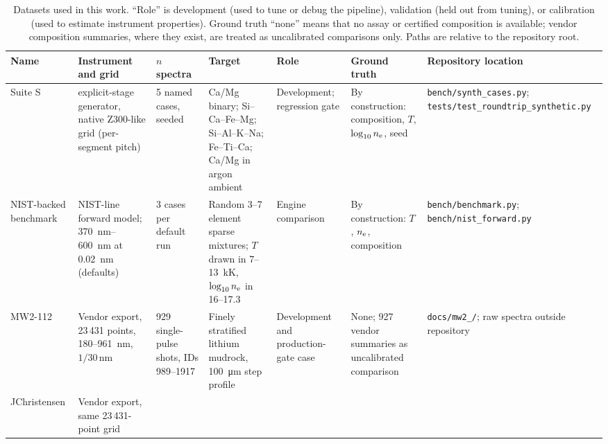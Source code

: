 \begin{table}[t]
\centering
\footnotesize
\setlength{\tabcolsep}{3pt}
\caption{Datasets used in this work. ``Role'' is development (used to tune or debug the pipeline), validation (held out from tuning), or calibration (used to estimate instrument properties). Ground truth ``none'' means that no assay or certified composition is available; vendor composition summaries, where they exist, are treated as uncalibrated comparisons only. Paths are relative to the repository root.}
\label{tab:datasets}
\begin{tabular}{@{}p{1.05cm}p{2.7cm}p{1.3cm}p{2.3cm}p{1.7cm}p{2.6cm}p{3.2cm}@{}}
\toprule
Name & Instrument and grid & $n$ spectra & Target & Role & Ground truth & Repository location \\
\midrule
Suite S & \alibz{} explicit-stage generator, native Z300-like grid (per-segment pitch) & 5 named cases, seeded & Ca/Mg binary; Si--Ca--Fe--Mg; Si--Al--K--Na; Fe--Ti--Ca; Ca/Mg in argon ambient & Development; regression gate & By construction: composition, $T$, $\log_{10}n_{\mathrm{e}}$, seed %
 & \texttt{bench/\allowbreak synth\_\allowbreak cases.py}; \texttt{tests/\allowbreak test\_\allowbreak roundtrip\_\allowbreak synthetic.py} \\
NIST-backed benchmark & NIST-line forward model; \SIrange{370}{600}{\nano\metre} at \SI{0.02}{\nano\metre} (defaults) & 3 cases per default run & Random 3--7 element sparse mixtures; $T$ drawn in 7--\SI{13}{\kilo\kelvin}, $\log_{10}n_{\mathrm{e}}$ in 16--17.3 %
 & Engine comparison & By construction: $T$, $n_{\mathrm{e}}$, composition & \texttt{bench/\allowbreak benchmark.py}; \texttt{bench/\allowbreak nist\_\allowbreak forward.py} \\
MW2-112 & Vendor export, 23\,431 points, 180--\SI{961}{\nano\metre}, $1/30$\,\si{\nano\metre} %
 & 929 single-pulse shots, IDs 989--1917 %
 & Finely stratified lithium mudrock, \SI{100}{\micro\metre} step profile & Development and production-gate case & None; 927 vendor summaries as uncalibrated comparison %
 & \texttt{docs/\allowbreak mw2\_\allowbreak 112/\allowbreak }; raw spectra outside repository \\
JChristensen & Vendor export, same 23\,431-point grid %

\end{tabular}
\end{table}
